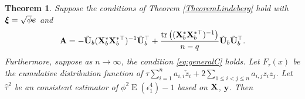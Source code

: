 \documentclass[11pt]{article}
\DeclareMathOperator{\mytr}{tr}
\DeclareMathOperator{\myE}{E}
\newcommand{\By}{\mathbf{y}}    \newcommand{\Bz}{\mathbf{z}}
\newcommand{\BA}{\mathbf{A}}    \newcommand{\BB}{\mathbf{B}}    \newcommand{\BC}{\mathbf{C}}    \newcommand{\BD}{\mathbf{D}}    \newcommand{\BE}{\mathbf{E}}    \newcommand{\BF}{\mathbf{F}}    \newcommand{\BG}{\mathbf{G}}    \newcommand{\BH}{\mathbf{H}}    \newcommand{\BI}{\mathbf{I}}    \newcommand{\BJ}{\mathbf{J}}    \newcommand{\BK}{\mathbf{K}}    \newcommand{\BL}{\mathbf{L}}
\newcommand{\bfsym}[1]{\ensuremath{\boldsymbol{#1}}}
\def\bxi{\bfsym {\xi}}
\theoremstyle{plain}
\newtheorem{theorem}{\quad\quad Theorem}
\theoremstyle{definition}
\theoremstyle{remark}
\begin{document}
\begin{theorem}
    Suppose the conditions of Theorem \ref{TheoremLindeberg} hold with 
    $\bxi=\sqrt \phi \bepsilon$ and
    \begin{equation*}
        \BA= -\tilde{\BU}_b (\BX_{b}^* \BX_b^{*\top})^{-1} \tilde{\BU}_b^\top 
        + \frac{\mytr\left( (\BX_b^* \BX_b^{*\top})^{-1} \right)}{n-q}\tilde{\BU}_b \tilde{\BU}_b^\top.
    \end{equation*}
    Furthermore, suppose as $n\to \infty$, the condition \eqref{eq:generalC} holds.
    Let $F_{\tau} (x)$ be the cumulative distribution function of $
            \tau \sum_{i=1}^n  a_{i,i}\check z_i
        +2\sum_{1\leq i <j \leq n} a_{i,j} z_i z_j
        $.
        Let $\hat \tau^2$ be an consistent estimator of $\phi^2 \myE (\epsilon_1^4)-1$ based on $\mathbf{X}$, $\By$.
    Then
    \label{thm:criticalValue}
\end{theorem}
\end{document}
